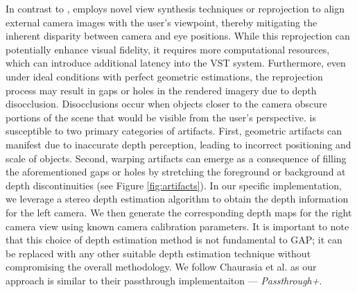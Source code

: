 In contrast to \DP, \GAP employs novel view synthesis techniques or reprojection to align external camera images with the user's viewpoint, thereby mitigating the inherent disparity between camera and eye positions. 
While this reprojection can potentially enhance visual fidelity, it requires more computational resources, which can introduce additional latency into the VST system. 
Furthermore, even under ideal conditions with perfect geometric estimations, the reprojection process may result in gaps or holes in the rendered imagery due to depth disocclusion. Disocclusions occur when objects closer to the camera obscure portions of the scene that would be visible from the user’s perspective. 
\GAP is susceptible to two primary categories of artifacts. First, geometric artifacts can manifest due to inaccurate depth perception, leading to incorrect positioning and scale of objects. 
Second, warping artifacts can emerge as a consequence of filling the aforementioned gaps or holes by stretching the foreground or background at depth discontinuities (see Figure \ref{fig:artifacts}). 
In our specific implementation, we leverage a stereo depth estimation algorithm to obtain the depth information for the left camera. We then generate the corresponding depth maps for the right camera view using known camera calibration parameters. It is important to note that this choice of depth estimation method is not fundamental to GAP; it can be replaced with any other suitable depth estimation technique without compromising the overall methodology. We follow Chaurasia et al. \cite{chaurasia2020passthroughplus} as our approach is similar to their passthrough implementaiton ---  \emph{Passthrough+}.

